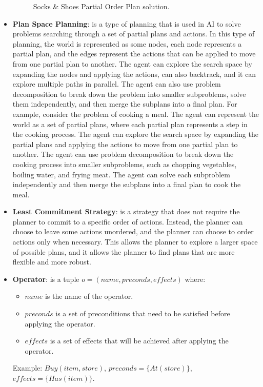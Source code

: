\begin{itemize}
\begin{figure}[ht]
          \caption{Socks \& Shoes Partial Order Plan solution.}
          \label{fig:socks_shoes_partial_order_plan}
        \end{figure}
  \item \label{def:plan_space_planning}
        \textbf{Plan Space Planning}: is a type of planning that is used in \ac{AI} to solve problems searching through a set of partial plans and actions. In this type of planning, the world is represented as some nodes, each node represents a partial plan, and the edges represent the actions that can be applied to move from one partial plan to another. The agent can explore the search space by expanding the nodes and applying the actions, can also backtrack, and it can explore multiple paths in parallel. The agent can also use problem decomposition to break down the problem into smaller subproblems, solve them independently, and then merge the subplans into a final plan. For example, consider the problem of cooking a meal. The agent can represent the world as a set of partial plans, where each partial plan represents a step in the cooking process. The agent can explore the search space by expanding the partial plans and applying the actions to move from one partial plan to another. The agent can use problem decomposition to break down the cooking process into smaller subproblems, such as chopping vegetables, boiling water, and frying meat. The agent can solve each subproblem independently and then merge the subplans into a final plan to cook the meal.

  \item \label{def:least_commitment_strategy}
        \textbf{Least Commitment Strategy}: is a strategy that does not require the planner to commit to a specific order of actions. Instead, the planner can choose to leave some actions unordered, and the planner can choose to order actions only when necessary. This allows the planner to explore a larger space of possible plans, and it allows the planner to find plans that are more flexible and more robust.

  \item \label{def:operator}
        \textbf{Operator}: is a tuple $o = (name, preconds, effects)$ where:
        \begin{itemize}
          \item $name$ is the name of the operator.
          \item $preconds$ is a set of preconditions that need to be satisfied before applying the operator.
          \item $effects$ is a set of effects that will be achieved after applying the operator.
        \end{itemize}
        Example: $Buy(item,store)$, $preconds = \{At(store)\}$, $effects = \{Has(item)\}$.


\end{itemize}

